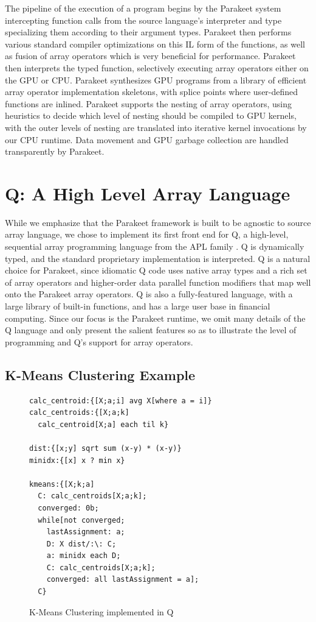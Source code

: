 \documentclass[preprint]{sigplanconf}
\begin{document}
The pipeline of the execution of a program begins by the Parakeet system
intercepting function calls from the source language's interpreter and type
specializing them according to their argument types.  Parakeet then performs
various standard compiler optimizations on this IL form of the functions, as
well as fusion of array operators which is very beneficial for performance.
Parakeet then interprets the typed function, selectively executing array
operators either on the GPU or CPU. Parakeet synthesizes GPU
programs from a library of efficient array operator implementation skeletons,
with splice points where user-defined functions are inlined. Parakeet supports
the nesting of array operators, using heuristics to decide which level of
nesting should be compiled to GPU kernels, with the outer levels of nesting are
translated into iterative kernel invocations by our CPU runtime.  Data movement
and GPU garbage collection are handled transparently by Parakeet.



\section{Q: A High Level Array Language}
\label{Q}

While we emphasize that the Parakeet framework is built to be agnostic to source
array language, we chose to implement its first front end for Q, a high-level,
sequential array programming language from the APL family \cite{Borr08}.
Q is dynamically typed, and the standard proprietary implementation is
interpreted. Q is a natural choice for Parakeet, since idiomatic Q code uses
native array types and a rich set of array operators and higher-order
data parallel function modifiers that map well onto the Parakeet array
operators. Q is also a fully-featured language, with a large library of built-in
functions, and has a large user base in financial computing. Since our
focus is the Parakeet runtime, we omit many details of the Q language and only
present the salient features so as to illustrate the level of programming
and Q's support for array operators.

\subsection{K-Means Clustering Example}
\begin{figure}[h!]
\begin{lstlisting}
calc_centroid:{[X;a;i] avg X[where a = i]}
calc_centroids:{[X;a;k] 
  calc_centroid[X;a] each til k}
  
dist:{[x;y] sqrt sum (x-y) * (x-y)}
minidx:{[x] x ? min x}

kmeans:{[X;k;a]
  C: calc_centroids[X;a;k];
  converged: 0b;
  while[not converged;
    lastAssignment: a;
    D: X dist/:\: C;
    a: minidx each D;
    C: calc_centroids[X;a;k];
    converged: all lastAssignment = a];
  C}
\end{lstlisting}
\caption{K-Means Clustering implemented in Q}
\label{QKMeans}
\end{figure}
\end{document}
